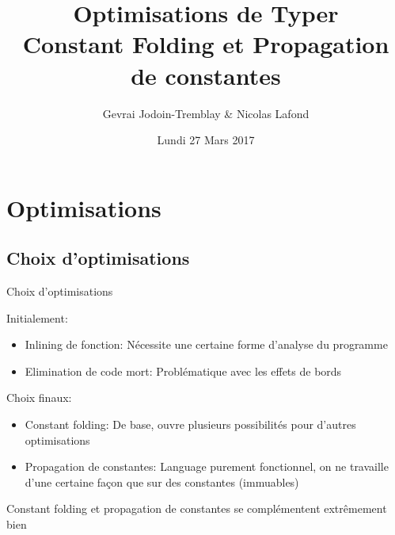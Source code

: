 \documentclass{beamer}
\title[Optimisations Typer]{Optimisations de Typer\\ Constant Folding et Propagation
  de constantes} %
\author{Gevrai Jodoin-Tremblay \& Nicolas Lafond} %
\institute[UDM] %
{
Université de Montréal \\ %
\medskip
}
\date{Lundi 27 Mars 2017} %
\begin{document}
\begin{frame}
\titlepage %
\end{frame}



\section{Optimisations} %
\subsection{Choix d'optimisations} 

\begin{frame}{Choix d'optimisations}

\pause

Initialement: 
  \begin{itemize}
    \item Inlining de fonction: Nécessite une certaine forme d'analyse du programme
    \item Elimination de code mort: Problématique avec les effets de bords
  \end{itemize}
 
\pause

Choix finaux:
  \begin{itemize}
    \item Constant folding: De base, ouvre plusieurs possibilités pour d'autres optimisations
    \item Propagation de constantes: Language purement fonctionnel, on ne
      travaille d'une certaine façon que sur des constantes (immuables)
  \end{itemize}

  Constant folding et propagation de constantes se complémentent extrêmement bien
\end{frame}
\end{document}
